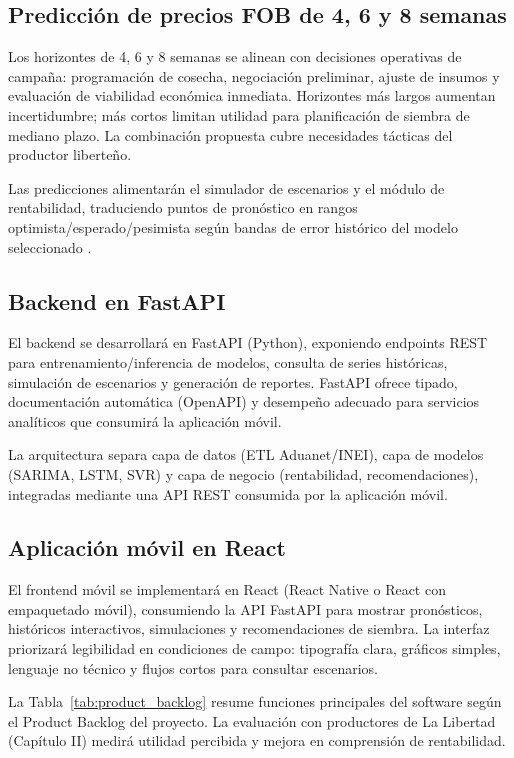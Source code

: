 \subsection{Predicci\'on de precios FOB de 4, 6 y 8 semanas}

Los horizontes de 4, 6 y 8 semanas se alinean con decisiones operativas de campa\~na: programaci\'on de cosecha, negociaci\'on preliminar, ajuste de insumos y evaluaci\'on de viabilidad econ\'omica inmediata. Horizontes m\'as largos aumentan incertidumbre; m\'as cortos limitan utilidad para planificaci\'on de siembra de mediano plazo. La combinaci\'on propuesta cubre necesidades t\'acticas del productor liberte\~no.

Las predicciones alimentar\'an el simulador de escenarios y el m\'odulo de rentabilidad, traduciendo puntos de pron\'ostico en rangos optimista/esperado/pesimista seg\'un bandas de error hist\'orico del modelo seleccionado \citep{Velasquez2025}.

\subsection{Backend en FastAPI}

El backend se desarrollar\'a en FastAPI (Python), exponiendo endpoints REST para entrenamiento/inferencia de modelos, consulta de series hist\'oricas, simulaci\'on de escenarios y generaci\'on de reportes. FastAPI ofrece tipado, documentaci\'on autom\'atica (OpenAPI) y desempe\~no adecuado para servicios anal\'iticos que consumir\'a la aplicaci\'on m\'ovil.

La arquitectura separa capa de datos (ETL Aduanet/INEI), capa de modelos (SARIMA, LSTM, SVR) y capa de negocio (rentabilidad, recomendaciones), integradas mediante una API REST consumida por la aplicaci\'on m\'ovil.

\subsection{Aplicaci\'on m\'ovil en React}

El frontend m\'ovil se implementar\'a en React (React Native o React con empaquetado m\'ovil), consumiendo la API FastAPI para mostrar pron\'osticos, hist\'oricos interactivos, simulaciones y recomendaciones de siembra. La interfaz priorizar\'a legibilidad en condiciones de campo: tipograf\'ia clara, gr\'aficos simples, lenguaje no t\'ecnico y flujos cortos para consultar escenarios.

La Tabla~\ref{tab:product_backlog} resume funciones principales del software seg\'un el Product Backlog del proyecto. La evaluaci\'on con productores de La Libertad (Cap\'itulo II) medir\'a utilidad percibida y mejora en comprensi\'on de rentabilidad.

